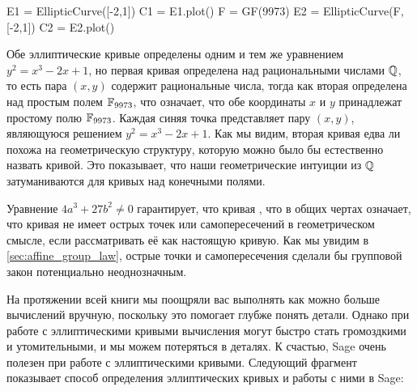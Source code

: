 \medskip

\begin{sagesilent}
E1 = EllipticCurve([-2,1])
C1 = E1.plot()
F = GF(9973)
E2 = EllipticCurve(F, [-2,1])
C2 = E2.plot()
\end{sagesilent}
\begin{minipage}{0.48\textwidth}
\end{minipage}
%
\begin{minipage}{0.48\textwidth}
\label{plot:elliptic_curve}
\end{minipage}

Обе эллиптические кривые определены одним и тем же уравнением  $y^2 = x^3-2x+1$, но первая кривая определена над рациональными числами $\mathbb{Q}$, то есть пара $(x,y)$ содержит рациональные числа, тогда как вторая определена над простым полем $\mathbb{F}_{9973}$, что означает, что обе координаты $x$ и $y$ принадлежат простому полю $\mathbb{F}_{9973}$. Каждая синяя точка представляет пару $(x,y)$, являющуюся решением $y^2 = x^3-2x+1$. Как мы видим, вторая кривая едва ли похожа на геометрическую структуру, которую можно было бы естественно назвать кривой. Это показывает, что наши геометрические интуиции из $\mathbb{Q}$ затуманиваются для кривых над конечными полями.

Уравнение $4a^3+ 27b^2\neq 0$ гарантирует, что кривая , что в общих чертах означает, что кривая не имеет острых точек или самопересечений в геометрическом смысле, если рассматривать её как настоящую кривую. Как мы увидим в \ref{sec:affine_group_law}, острые точки и самопересечения сделали бы групповой закон потенциально неоднозначным.

На протяжении всей книги мы поощряли вас выполнять как можно больше вычислений вручную, поскольку это помогает глубже понять детали. Однако при работе с эллиптическими кривыми вычисления могут быстро стать громоздкими и утомительными, и мы можем потеряться в деталях. К счастью, Sage очень полезен при работе с эллиптическими кривыми. Следующий фрагмент показывает способ определения эллиптических кривых и работы с ними в Sage:

